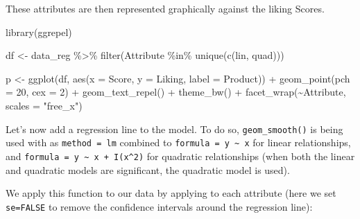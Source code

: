 \documentclass[
]{krantz}
\makeatletter
\newenvironment{Shaded}{\begin{snugshade}}{\end{snugshade}}
\newcommand{\AttributeTok}[1]{\textcolor[rgb]{0.61,0.61,0.61}{#1}}
\newcommand{\ControlFlowTok}[1]{\textcolor[rgb]{0.27,0.27,0.27}{\textbf{#1}}}
\newcommand{\DecValTok}[1]{\textcolor[rgb]{0.06,0.06,0.06}{#1}}
\newcommand{\FunctionTok}[1]{\textcolor[rgb]{0,0,0}{#1}}
\newcommand{\NormalTok}[1]{#1}
\newcommand{\OtherTok}[1]{\textcolor[rgb]{0.37,0.37,0.37}{#1}}
\newcommand{\SpecialCharTok}[1]{\textcolor[rgb]{0,0,0}{#1}}
\newcommand{\StringTok}[1]{\textcolor[rgb]{0.5,0.5,0.5}{#1}}
\newenvironment{kframe}{%
\medskip{}
\setlength{\fboxsep}{.8em}
 \def\at@end@of@kframe{}%
 \ifinner\ifhmode%
  \def\at@end@of@kframe{\end{minipage}}%
  \begin{minipage}{\columnwidth}%
 \fi\fi%
 \def\FrameCommand##1{\hskip\@totalleftmargin \hskip-\fboxsep
 \colorbox{shadecolor}{##1}\hskip-\fboxsep
     \hskip-\linewidth \hskip-\@totalleftmargin \hskip\columnwidth}%
 \MakeFramed {\advance\hsize-\width
   \@totalleftmargin\z@ \linewidth\hsize
   \@setminipage}}%
 {\par\unskip\endMakeFramed%
 \at@end@of@kframe}
\renewenvironment{Shaded}{\begin{kframe}}{\end{kframe}}
\makeatother
\begin{document}
These attributes are then represented graphically against the liking Scores.

\begin{Shaded}
\begin{Highlighting}[]
\FunctionTok{library}\NormalTok{(ggrepel)}

\NormalTok{df }\OtherTok{\textless{}{-}}\NormalTok{ data\_reg }\SpecialCharTok{\%\textgreater{}\%}
  \FunctionTok{filter}\NormalTok{(Attribute }\SpecialCharTok{\%in\%} \FunctionTok{unique}\NormalTok{(}\FunctionTok{c}\NormalTok{(lin, quad)))}

\NormalTok{p }\OtherTok{\textless{}{-}} \FunctionTok{ggplot}\NormalTok{(df, }\FunctionTok{aes}\NormalTok{(}\AttributeTok{x =}\NormalTok{ Score, }\AttributeTok{y =}\NormalTok{ Liking, }\AttributeTok{label =}\NormalTok{ Product)) }\SpecialCharTok{+}
  \FunctionTok{geom\_point}\NormalTok{(}\AttributeTok{pch =} \DecValTok{20}\NormalTok{, }\AttributeTok{cex =} \DecValTok{2}\NormalTok{) }\SpecialCharTok{+}
  \FunctionTok{geom\_text\_repel}\NormalTok{() }\SpecialCharTok{+}
  \FunctionTok{theme\_bw}\NormalTok{() }\SpecialCharTok{+}
  \FunctionTok{facet\_wrap}\NormalTok{(}\SpecialCharTok{\textasciitilde{}}\NormalTok{Attribute, }\AttributeTok{scales =} \StringTok{"free\_x"}\NormalTok{)}
\end{Highlighting}
\end{Shaded}

Let's now add a regression line to the model. To do so, \texttt{geom\_smooth()} is being used with as \texttt{method\ =\ lm} combined to \texttt{formula\ =\ \textquotesingle{}y\ \textasciitilde{}\ x\textquotesingle{}} for linear relationships, and \texttt{formula\ =\ \textquotesingle{}y\ \textasciitilde{}\ x\ +\ I(x\^{}2)\textquotesingle{}} for quadratic relationships (when both the linear and quadratic models are significant, the quadratic model is used).

\begin{Shaded}
\end{Shaded}

We apply this function to our data by applying to each attribute (here we set \texttt{se=FALSE} to remove the confidence intervals around the regression line):
\end{document}
